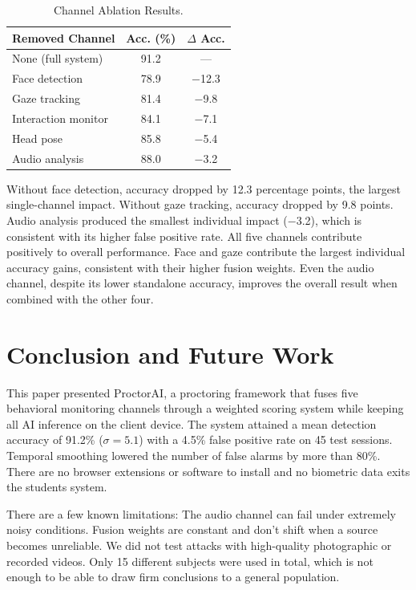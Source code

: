\documentclass[runningheads]{llncs}
\begin{document}
\begin{table}[htbp]
\caption{Channel Ablation Results.}\label{tab:ablation}
\centering
\begin{tabular}{@{}lcc@{}}
\toprule
\textbf{Removed Channel} & \textbf{Acc. (\%)} & \textbf{$\Delta$ Acc.} \\
\midrule
None (full system)      & 91.2 & ---     \\
Face detection          & 78.9 & $-$12.3 \\
Gaze tracking           & 81.4 & $-$9.8  \\
Interaction monitor     & 84.1 & $-$7.1  \\
Head pose               & 85.8 & $-$5.4  \\
Audio analysis          & 88.0 & $-$3.2  \\
\bottomrule
\end{tabular}
\end{table}

Without face detection, accuracy dropped by 12.3 percentage points, the largest single-channel impact. Without gaze tracking, accuracy dropped by 9.8 points. Audio analysis produced the smallest individual impact ($-$3.2), which is consistent with its higher false positive rate. All five channels contribute positively to overall performance. Face and gaze contribute the largest individual accuracy gains, consistent with their higher fusion weights. Even the audio channel, despite its lower standalone accuracy, improves the overall result when combined with the other four.

\section{Conclusion and Future Work}\label{sec:conclusion}

This paper presented ProctorAI, a proctoring framework that fuses five behavioral monitoring channels through a weighted scoring system while keeping all AI inference on the client device. The system attained a mean detection accuracy of 91.2\% ($\sigma = 5.1$) with a 4.5\% false positive rate on 45 test sessions. Temporal smoothing lowered the number of false alarms by more than 80\%. There are no browser extensions or software to install and no biometric data exits the students system.

There are a few known limitations: The audio channel can fail under extremely noisy conditions. Fusion weights are constant and don't shift when a source becomes unreliable. We did not test attacks with high-quality photographic or recorded videos. Only 15 different subjects were used in total, which is not enough to be able to draw firm conclusions to a general population.
\end{document}
